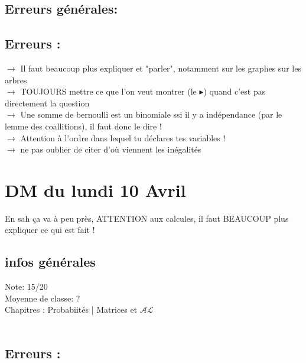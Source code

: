 \documentclass{book}
\begin{document}
\subsection{Erreurs générales: } 


\subsection{Erreurs : }

$\rightarrow$ Il faut beaucoup plus expliquer et "parler", notamment sur les graphes sur les arbres \\
$\rightarrow$ TOUJOURS mettre ce que l'on veut montrer (le $\blacktriangleright$) quand c'est pas directement la question \\
$\rightarrow$ Une somme de bernoulli est un binomiale ssi il y a indépendance (par le lemme des coallitions), il faut donc le dire ! \\
$\rightarrow$ Attention à l'ordre dans lequel tu déclares tes variables ! \\
$\rightarrow$ ne pas oublier de citer d'où viennent les inégalités




\section{DM du lundi 10 Avril}

\begin{tcolorbox}[width={14cm},colback={yellow!20!white},title={\textbf{Commentaire générale sur ce DM}},colbacktitle=red!40!white,coltitle=black]    
	En sah ça va à peu près, ATTENTION aux calcules, il faut BEAUCOUP plus expliquer ce qui est fait !
\end{tcolorbox}


\subsection{infos générales}

Note: 15/20\\
Moyenne de classe: ? \\

Chapitres : Probabiités | Matrices et $\mathcal{A} \mathcal{L}$  \\ \\

\subsection{Erreurs : }
\end{document}
